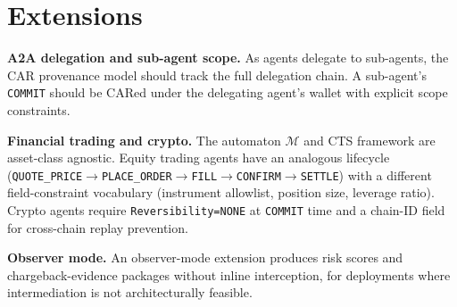 \documentclass{article}
\begin{document}
\section{Extensions}

\textbf{A2A delegation and sub-agent scope.} As agents delegate to sub-agents, the CAR provenance model should track the full delegation chain. A sub-agent's \texttt{COMMIT} should be CARed under the delegating agent's wallet with explicit scope constraints.

\textbf{Financial trading and crypto.} The automaton $\mathcal{M}$ and CTS framework are asset-class agnostic. Equity trading agents have an analogous lifecycle (\texttt{QUOTE\_PRICE}$\to$\texttt{PLACE\_ORDER}$\to$\texttt{FILL}$\to$\texttt{CONFIRM}$\to$\texttt{SETTLE}) with a different field-constraint vocabulary (instrument allowlist, position size, leverage ratio). Crypto agents require \texttt{Reversibility=NONE} at \texttt{COMMIT} time and a chain-ID field for cross-chain replay prevention.

\textbf{Observer mode.} An observer-mode extension produces risk scores and chargeback-evidence packages without inline interception, for deployments where intermediation is not architecturally feasible.


\end{document}
